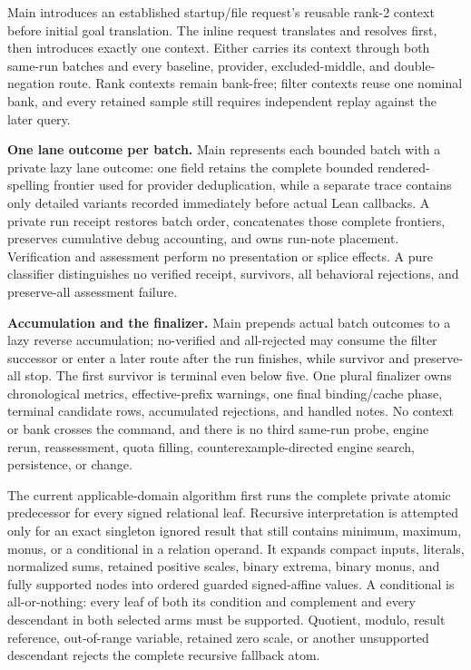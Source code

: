 \documentclass[10pt,letterpaper,oneside]{report}
\newcommand{\code}[1]{\texttt{\detokenize{#1}}}
\begin{document}
  Main introduces an established startup/file request's reusable rank-2 context before initial goal translation. The inline request translates and resolves first, then introduces exactly one context. Either carries its context through both same-run batches and every baseline, provider, excluded-middle, and double-negation route. Rank contexts remain bank-free; filter contexts reuse one nominal bank, and every retained sample still requires independent replay against the later query.

  \textbf{One lane outcome per batch.} Main represents each bounded batch with a private lazy lane outcome: one field retains the complete bounded rendered-spelling frontier used for provider deduplication, while a separate trace contains only detailed variants recorded immediately before actual Lean callbacks. A private run receipt restores batch order, concatenates those complete frontiers, preserves cumulative debug accounting, and owns run-note placement. Verification and assessment perform no presentation or splice effects. A pure classifier distinguishes no verified receipt, survivors, all behavioral rejections, and preserve-all assessment failure.

  \textbf{Accumulation and the finalizer.} Main prepends actual batch outcomes to a lazy reverse accumulation; no-verified and all-rejected may consume the filter successor or enter a later route after the run finishes, while survivor and preserve-all stop. The first survivor is terminal even below five. One plural finalizer owns chronological metrics, effective-prefix warnings, one final binding/cache phase, terminal candidate rows, accumulated rejections, and handled notes. No context or bank crosses the command, and there is no third same-run probe, engine rerun, reassessment, quota filling, counterexample-directed engine search, persistence, or \code{ReplState} change.

The current applicable-domain algorithm first runs the complete private atomic predecessor for every signed relational leaf. Recursive interpretation is attempted only for an exact singleton ignored result that still contains minimum, maximum, monus, or a conditional in a relation operand. It expands compact inputs, literals, normalized sums, retained positive scales, binary extrema, binary monus, and fully supported \code{LengthIf} nodes into ordered guarded signed-affine values. A conditional is all-or-nothing: every leaf of both its condition and complement and every descendant in both selected arms must be supported. Quotient, modulo, result reference, out-of-range variable, retained zero scale, or another unsupported descendant rejects the complete recursive fallback atom.
\end{document}
